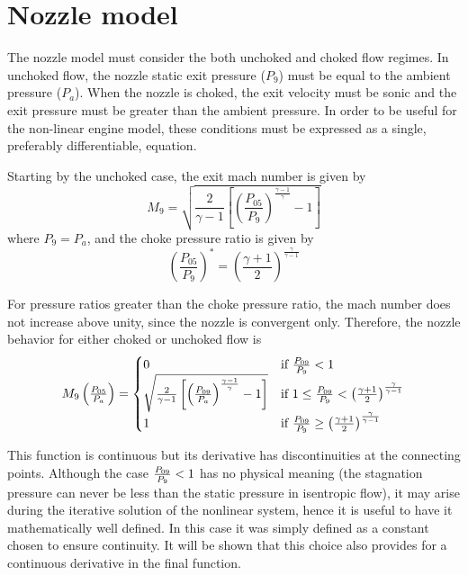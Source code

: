 \section{Nozzle model}
The nozzle model must consider the both unchoked and choked flow regimes. 
In unchoked flow, the nozzle static exit pressure ($P_9$) must be equal to the ambient pressure ($P_a$). 
When the nozzle is choked, the exit velocity must be sonic 
and the exit pressure must be greater than the ambient pressure.
In order to be useful for the non-linear engine model, these conditions must be expressed as a single, preferably differentiable, equation. 

Starting by the unchoked case, the exit mach number is given by
\begin{equation}
    M_9 = \sqrt{\frac{2}{\gamma-1}\left[\left(\frac{P_{05}}{P_9}\right)^{\frac{\gamma-1}{\gamma}}-1\right]}
\end{equation}
where $P_9=P_a$, and the choke pressure ratio is given by
\begin{equation}
    \left(\frac{P_{05}}{P_9}\right)^* = \left(\frac{\gamma+1}{2}\right)^\frac{\gamma}{\gamma-1}
\end{equation}

For pressure ratios greater than the choke pressure ratio, the mach number does not increase above unity, 
since the nozzle is convergent only. Therefore, the nozzle behavior for either choked or unchoked flow is
\begin{equation}
    \label{eqn:M9}
    M_9\left(\tfrac{P_{05}}{P_a}\right) = \begin{cases}
        0 &\text{if $\frac{P_{09}}{P_{9}} < 1$} \\
        \sqrt{\frac{2}{\gamma-1}\left[\left(\frac{P_{09}}{P_a}\right)^{\frac{\gamma-1}{\gamma}}-1\right]} 
        &\text{if $1 \leq \frac{P_{09}}{P_{9}} <\left(\frac{\gamma+1}{2}\right)^\frac{\gamma}{\gamma-1}$} \\
        1 & \text{if $\frac{P_{09}}{P_{9}} \geq \left(\frac{\gamma+1}{2}\right)^\frac{\gamma}{\gamma-1}$ }
    \end{cases}
\end{equation}


This function is continuous but its derivative has discontinuities at the connecting points. 
Although the case $\frac{P_{09}}{P_{9}}<1$ has no physical meaning 
(the stagnation pressure can never be less than the static pressure in isentropic flow), 
it may arise during the iterative solution of the nonlinear system, 
hence it is useful to have it mathematically well defined. 
In this case it was simply defined as a constant chosen to ensure continuity. It will be shown that this choice also provides for a continuous derivative in the final function.


